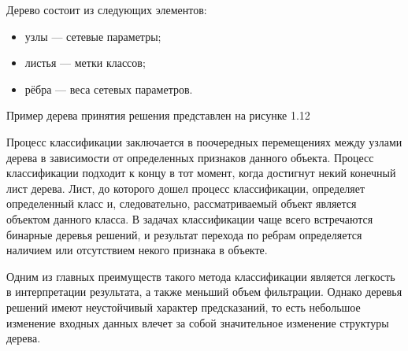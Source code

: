 Дерево состоит из следующих элементов:

\begin{itemize}
    \item узлы --- сетевые параметры;
    \item листья --- метки классов;
    \item рёбра --- веса сетевых параметров.
\end{itemize}

Пример дерева принятия решения представлен на рисунке 1.12


Процесс классификации заключается в поочередных перемещениях между
узлами дерева в зависимости от определенных признаков данного объекта.
Процесс классификации подходит к концу в тот момент, когда достигнут некий
конечный лист дерева. Лист, до которого дошел процесс классификации,
определяет определенный класс и, следовательно, рассматриваемый объект
является объектом данного класса. В задачах классификации чаще всего
встречаются бинарные деревья решений, и результат перехода по ребрам
определяется наличием или отсутствием некого признака в объекте.


Одним из главных преимуществ такого метода классификации является
легкость в интерпретации результата, а также меньший объем фильтрации.
Однако деревья решений имеют неустойчивый характер предсказаний, то есть
небольшое изменение входных данных влечет за собой значительное изменение
структуры дерева.




